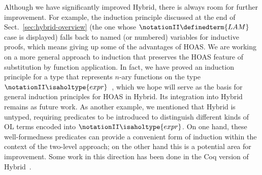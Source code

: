 \documentclass[copyright,creativecommons]{eptcs}
\begin{document}
Although we have significantly improved Hybrid, there is always room
for further improvement.  For example, the induction principle
discussed at the end of Sect.~\ref{sec:hybrid-overview} (the one whose
\(\notationII \definedterm{LAM}\) case is displayed) falls back to
named (or numbered) variables for inductive proofs, which means giving
up some of the advantages of HOAS.  We are working on a more general
approach to induction that preserves the HOAS feature of substitution
by function application.  In fact, we have proved an induction
principle for a type that represents $n$-ary functions on the type
\(\notationII \isaholtype{expr}\)~\cite{martin:2010a}, which we hope will serve as the basis
for general induction principles for HOAS in Hybrid.  Its integration
into Hybrid remains as future work.  As another example, we mentioned
that Hybrid is untyped, requiring predicates to be introduced to
distinguish different kinds of OL terms encoded into \(\notationII \isaholtype{expr}\).  On
one hand, these well-formedness predicates can provide a convenient
form of induction within the context of the two-level approach; on the
other hand this is a potential area for improvement.  Some work in
this direction has been done in the Coq version of
Hybrid~\cite{capretta/felty:2009}.
\end{document}
